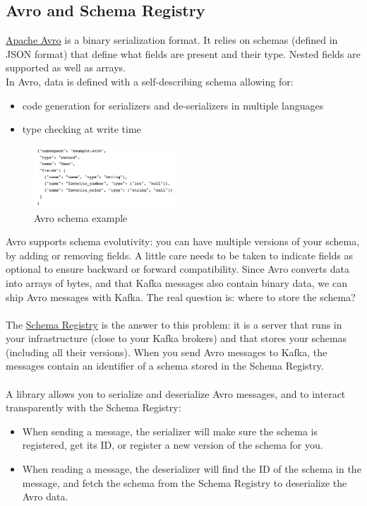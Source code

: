 \documentclass[10pt,a4paper]{article}
\newcommand{\nline}{\\~\\}
\begin{document}
\subsection{Avro and Schema Registry}
\href{https://avro.apache.org/}{Apache Avro} is a binary serialization format. It relies on schemas (defined in JSON format) that define what fields are present and their type. Nested fields are supported as well as arrays. \\
In Avro, data is defined with a self-describing schema allowing for:
\begin{itemize}
	\item code generation for serializers and de-serializers in multiple languages
	\item type checking at write time
\end{itemize}
\begin{figure}[ht!]
 \hfill \includegraphics[width=150pt]{images/avro-schema-ex}\hspace*{\fill}
 \caption{Avro schema example}
\end{figure} 
Avro supports schema evolutivity: you can have multiple versions of your schema, by adding or removing fields. A little care needs to be taken to indicate fields as optional to ensure backward or forward compatibility. Since Avro converts data into arrays of bytes, and that Kafka messages also contain binary data, we can ship Avro messages with Kafka. The real question is: where to store the schema?
\nline
The \href{https://docs.confluent.io/current/schema-registry/index.html}{Schema Registry} is the answer to this problem: it is a server that runs in your infrastructure (close to your Kafka brokers) and that stores your schemas (including all their versions). When you send Avro messages to Kafka, the messages contain an identifier of a schema stored in the Schema Registry.
\nline
A library allows you to serialize and deserialize Avro messages, and to interact transparently with the Schema Registry:
\begin{itemize}
	\item When sending a message, the serializer will make sure the schema is registered, get its ID, or register a new version of the schema for you.
	\item When reading a message, the deserializer will find the ID of the schema in the message, and fetch the schema from the Schema Registry to deserialize the Avro data.
\end{itemize}
\end{document}
